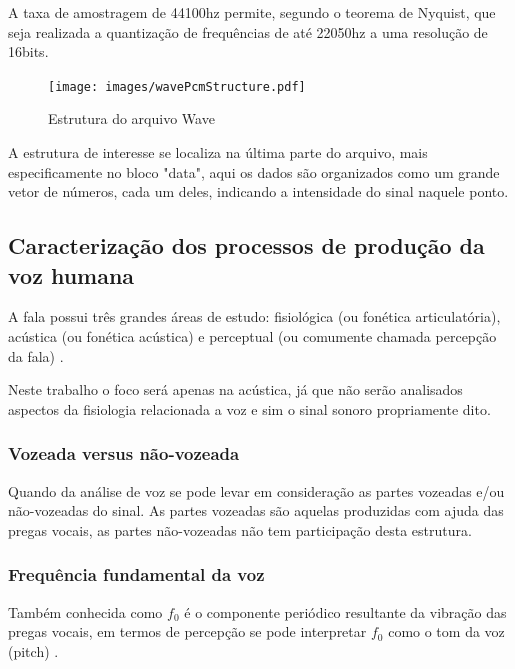 \begin{myenv}{1.5}
				\par A taxa de amostragem de 44100hz permite, segundo o teorema de Nyquist, que seja realizada a quantização de frequências de até 22050hz a uma resolução de 16bits.
			
				\begin{figure}[h]
					\centering
					\texttt{[image: images/wavePcmStructure.pdf]}
					\caption{Estrutura do arquivo Wave}
					\label{fig:wavePcmStructure}
				\end{figure}
				
				\par A estrutura de interesse se localiza na última parte do arquivo, mais especificamente no bloco "data", aqui os dados são organizados como um grande vetor de números, cada um deles, indicando a intensidade do sinal naquele ponto.
			\subsection{Caracterização dos processos de produção da voz humana}
				\par A fala possui três grandes áreas de estudo: fisiológica (ou fonética articulatória),  acústica  (ou fonética acústica)  e  perceptual  (ou  comumente  chamada percepção  da  fala) \cite{kremer2014eficiencia}.
				\par Neste trabalho o foco será apenas na acústica, já que não serão analisados aspectos da fisiologia relacionada a voz e sim o sinal sonoro propriamente dito.
				
				\subsubsection{Vozeada versus não-vozeada}

				\par Quando da análise de voz se pode levar em consideração as partes vozeadas e/ou não-vozeadas do sinal. As partes vozeadas são aquelas produzidas com ajuda das pregas vocais, as partes não-vozeadas não tem participação desta estrutura.
				
				\subsubsection{Frequência fundamental da voz}
					\par Também conhecida como $f_0$ é o componente periódico resultante da vibração das pregas vocais, em termos de percepção se pode interpretar $f_0$ como o tom da voz (pitch) \cite{kremer2014eficiencia}.
				

\end{myenv}
